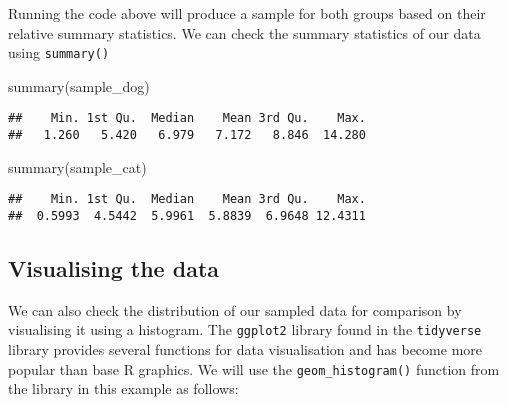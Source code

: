 \documentclass[
]{book}
\newenvironment{Shaded}{\begin{snugshade}}{\end{snugshade}}
\newcommand{\FunctionTok}[1]{\textcolor[rgb]{0.00,0.00,0.00}{#1}}
\newcommand{\NormalTok}[1]{#1}
\begin{document}
Running the code above will produce a sample for both groups based on their relative summary statistics. We can check the summary statistics of our data using \texttt{summary()}

\begin{Shaded}
\begin{Highlighting}[]
\FunctionTok{summary}\NormalTok{(sample\_dog)}
\end{Highlighting}
\end{Shaded}

\begin{verbatim}
##    Min. 1st Qu.  Median    Mean 3rd Qu.    Max. 
##   1.260   5.420   6.979   7.172   8.846  14.280
\end{verbatim}

\begin{Shaded}
\begin{Highlighting}[]
\FunctionTok{summary}\NormalTok{(sample\_cat)}
\end{Highlighting}
\end{Shaded}

\begin{verbatim}
##    Min. 1st Qu.  Median    Mean 3rd Qu.    Max. 
##  0.5993  4.5442  5.9961  5.8839  6.9648 12.4311
\end{verbatim}

\hypertarget{visualising-the-data}{%
\subsection{Visualising the data}\label{visualising-the-data}}

We can also check the distribution of our sampled data for comparison by visualising it using a histogram. The \texttt{ggplot2} library found in the \texttt{tidyverse} library provides several functions for data visualisation and has become more popular than base R graphics. We will use the \texttt{geom\_histogram()} function from the library in this example as follows:
\end{document}
